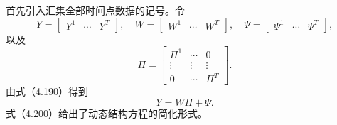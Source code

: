 首先引入汇集全部时间点数据的记号。令
\[
Y=\begin{bmatrix}Y^1&\cdots&Y^T\end{bmatrix},\quad
W=\begin{bmatrix}W^1&\cdots&W^T\end{bmatrix},\quad
\Psi=\begin{bmatrix}\Psi^1&\cdots&\Psi^T\end{bmatrix},
\]
以及
\[
\Pi=\begin{bmatrix}
\Pi^1&\cdots&0\\\vdots&\vdots&\vdots\\0&\cdots&\Pi^T
\end{bmatrix}.
\]
由式（4.190）得到
\begin{equation}
Y=W\Pi+\Psi.\tag{4.200}
\end{equation}
式（4.200）给出了动态结构方程的简化形式。

